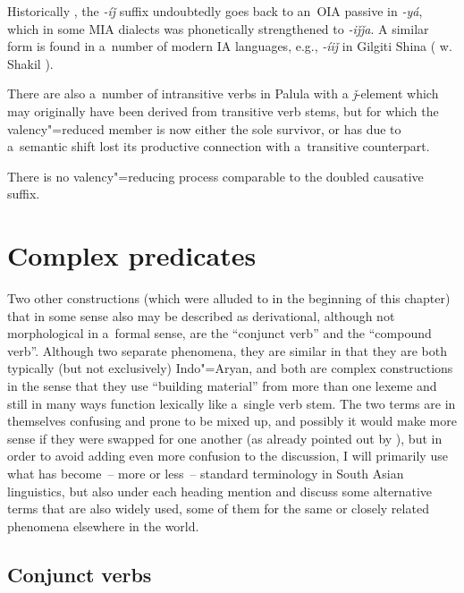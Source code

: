 Historically \citep[316--317]{masica1991}, the \textit{-íǰ} suffix undoubtedly goes back to an~OIA passive in \textit{-yá}, which in some MIA dialects was phonetically strengthened to \textit{-iǰǰa}. A similar form is found in a~number of modern IA languages, e.g., \textit{-íiǰ} in Gilgiti Shina (\citeauthor{radloffshakil1998} w. Shakil \citeyear[116]{radloffshakil1998}). 



There are also a~number of intransitive verbs in Palula with a \textit{ǰ}-element which may originally have been derived from transitive verb stems, but for which the valency"=reduced member is now either the sole survivor, or has due to a~semantic shift lost its productive connection with a~transitive counterpart.



There is no valency"=reducing process comparable to the doubled causative suffix.


\section{Complex predicates}
\label{sec:8-6}


Two other constructions (which were alluded to in the beginning of this chapter) that in some sense also may be described as derivational, although not morphological in a~formal sense, are the ``conjunct verb'' and the ``compound verb''. Although two separate phenomena, they are similar in that they are both typically (but not exclusively) Indo"=Aryan, and both are complex constructions in the sense that they use ``building material'' from more than one lexeme and still in many ways function lexically like a~single verb stem. The two terms are in themselves confusing and prone to be mixed up, and possibly it would make more sense if they were swapped for one another (as already pointed out by \citealt[326]{masica1991}), but in order to avoid adding even more confusion to the discussion, I will primarily use what has become~-- more or less~-- standard terminology in South Asian linguistics, but also under each heading mention and discuss some alternative terms that are also widely used, some of them for the same or closely related phenomena elsewhere in the world.


\subsection{Conjunct verbs}
\label{subsec:8-6-1}

